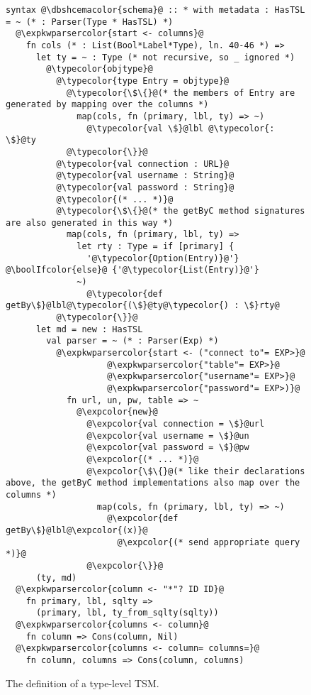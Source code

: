 \documentclass{sig-alternate}
\newcommand{\expkwparsercolor}[1]{\textcolor[HTML]{336699}{#1}}
\newcommand{\expcolor}[1]{\textcolor[HTML]{FF0033}{#1}}
\newcommand{\typecolor}[1]{\textcolor[HTML]{660066}{#1}}
\newcommand{\boolIfcolor}[1]{\textcolor[HTML]{5E0C0C}{#1}}
\newcommand{\dbshcemacolor}[1]{\textcolor[HTML]{5AC3D1}{#1}}
\newcommand{\mycaption}[1]{\vspace{-4px}\caption{#1}\vspace{-2px}}
\begin{document}
\begin{figure}[t]
\begin{lstlisting}[style=wyvern]
syntax @\dbshcemacolor{schema}@ :: * with metadata : HasTSL = ~ (* : Parser(Type * HasTSL) *)
  @\expkwparsercolor{start <- columns}@
    fn cols (* : List(Bool*Label*Type), ln. 40-46 *) =>
      let ty = ~ : Type (* not recursive, so _ ignored *)
        @\typecolor{objtype}@ 
          @\typecolor{type Entry = objtype}@
            @\typecolor{\$\{}@(* the members of Entry are generated by mapping over the columns *)
              map(cols, fn (primary, lbl, ty) => ~)
                @\typecolor{val \$}@lbl @\typecolor{:  \$}@ty
            @\typecolor{\}}@
          @\typecolor{val connection : URL}@
          @\typecolor{val username : String}@
          @\typecolor{val password : String}@
          @\typecolor{(* ... *)}@
          @\typecolor{\$\{}@(* the getByC method signatures are also generated in this way *) 
            map(cols, fn (primary, lbl, ty) => 
              let rty : Type = if [primary] {
                '@\typecolor{Option(Entry)}@'} @\boolIfcolor{else}@ {'@\typecolor{List(Entry)}@'}
              ~)
                @\typecolor{def getBy\$}@lbl@\typecolor{(\$}@ty@\typecolor{) : \$}rty@
          @\typecolor{\}}@
      let md = new : HasTSL
        val parser = ~ (* : Parser(Exp) *)
          @\expkwparsercolor{start <- ("connect to"= EXP>}@
                    @\expkwparsercolor{"table"= EXP>}@
                    @\expkwparsercolor{"username"= EXP>}@
                    @\expkwparsercolor{"password"= EXP>)}@
            fn url, un, pw, table => ~
              @\expcolor{new}@ 
                @\expcolor{val connection = \$}@url
                @\expcolor{val username = \$}@un
                @\expcolor{val password = \$}@pw
                @\expcolor{(* ... *)}@
                @\expcolor{\$\{}@(* like their declarations above, the getByC method implementations also map over the columns *)
                  map(cols, fn (primary, lbl, ty) => ~)
                    @\expcolor{def getBy\$}@lbl@\expcolor{(x)}@ 
                      @\expcolor{(* send appropriate query *)}@
                @\expcolor{\}}@
      (ty, md)
  @\expkwparsercolor{column <- "*"? ID ID}@
    fn primary, lbl, sqlty => 
      (primary, lbl, ty_from_sqlty(sqlty))
  @\expkwparsercolor{columns <- column}@
    fn column => Cons(column, Nil)
  @\expkwparsercolor{columns <- column= columns=}@
    fn column, columns => Cons(column, columns)
\end{lstlisting}
\mycaption{The definition of a type-level TSM.}
\label{typekw-example-1}
\end{figure}
\end{document}

